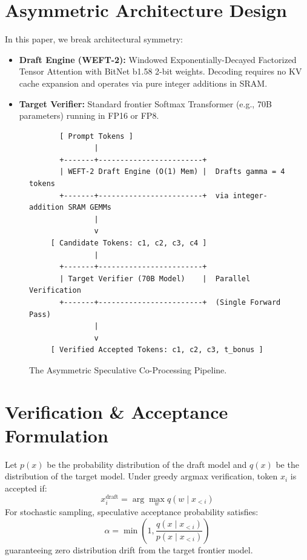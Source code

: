 \documentclass[11pt,a4paper]{article}
\begin{document}
\section{Asymmetric Architecture Design}
In this paper, we break architectural symmetry:
\begin{itemize}
    \item \textbf{Draft Engine (WEFT-2):} Windowed Exponentially-Decayed Factorized Tensor Attention with BitNet b1.58 2-bit weights. Decoding requires no KV cache expansion and operates via pure integer additions in SRAM.
    \item \textbf{Target Verifier:} Standard frontier Softmax Transformer (e.g., 70B parameters) running in FP16 or FP8.
\end{itemize}

\begin{figure}[h]
\centering
\begin{verbatim}
       [ Prompt Tokens ]
               |
       +-------+------------------------+
       | WEFT-2 Draft Engine (O(1) Mem) |  Drafts gamma = 4 tokens
       +-------+------------------------+  via integer-addition SRAM GEMMs
               |
               v
     [ Candidate Tokens: c1, c2, c3, c4 ]
               |
       +-------+------------------------+
       | Target Verifier (70B Model)    |  Parallel Verification
       +-------+------------------------+  (Single Forward Pass)
               |
               v
     [ Verified Accepted Tokens: c1, c2, c3, t_bonus ]
\end{verbatim}
\caption{The Asymmetric Speculative Co-Processing Pipeline.}
\label{fig:pipeline}
\end{figure}

\section{Verification \& Acceptance Formulation}
Let $p(x)$ be the probability distribution of the draft model and $q(x)$ be the distribution of the target model. Under greedy argmax verification, token $x_{i}$ is accepted if:
\begin{equation}
x_{i}^{\text{draft}} = \arg\max_{w} q(w \mid x_{<i})
\end{equation}
For stochastic sampling, speculative acceptance probability satisfies:
\begin{equation}
\alpha = \min\left(1, \frac{q(x \mid x_{<i})}{p(x \mid x_{<i})}\right)
\end{equation}
guaranteeing zero distribution drift from the target frontier model.
\end{document}
